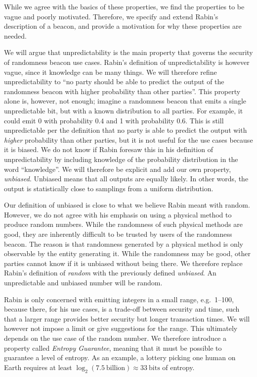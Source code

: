 While we agree with the basics of these properties, we find the properties to be vague and poorly motivated. Therefore, we specify and extend Rabin's description of a beacon, and provide a motivation for why these properties are needed.

We will argue that unpredictability is the main property that governs the security of randomness beacon use cases. Rabin's definition of unpredictability is however vague, since it knowledge can be many things. We will therefore refine unpredictability to \enquote{no party should be able to predict the output of the randomness beacon with higher probability than other parties}. This property alone is, however, not enough; imagine a randomness beacon that emits a single unpredictable bit, but with a known distribution to all parties. For example, it could emit 0 with probability $0.4$ and 1 with probability $0.6$. This is still unpredictable per the definition that no party is able to predict the output with \emph{higher} probability than other parties, but it is not useful for the use cases because it is biased. We do not know if Rabin foresaw this in his definition of unpredictability by including knowledge of the probability distribution in the word \enquote{knowledge}. We will therefore be explicit and add our own property, \emph{unbiased}. Unbiased means that all outputs are equally likely. In other words, the output is statistically close to samplings from a uniform distribution.

Our definition of unbiased is close to what we believe Rabin meant with random. However, we do not agree with his emphasis on using a physical method to produce random numbers. While the randomness of such physical methods are good, they are inherently difficult to be trusted by users of the randomness beacon. The reason is that randomness generated by a physical method is only observable by the entity generating it. While the randomness may be good, other parties cannot know if it is unbiased without being there. We therefore replace Rabin's definition of \emph{random} with the previously defined \emph{unbiased}. An unpredictable and unbiased number will be random.

Rabin is only concerned with emitting integers in a small range, e.g.\ 1--100, because there, for his use cases, is a trade-off between security and time, such that a larger range provides better security but longer transaction times. We will however not impose a limit or give suggestions for the range. This ultimately depends on the use case of the random number. We therefore introduce a property called \emph{Entropy Guarantee}, meaning that it must be possible to guarantee a level of entropy. As an example, a lottery picking one human on Earth requires at least $\log_2(7.5~\text{billion}) \approx 33~\text{bits}$ of entropy.

